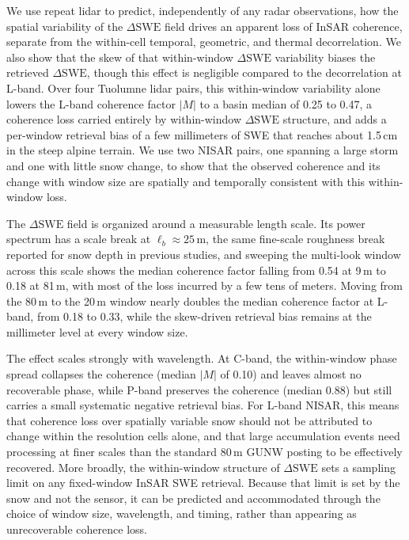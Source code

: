 \documentclass[tc, manuscript]{copernicus}
\begin{document}
\conclusions  %
We use repeat lidar to predict, independently of any radar observations, how the spatial variability of the $\Delta\mathrm{SWE}$ field drives an apparent loss of InSAR coherence, separate from the within-cell temporal, geometric, and thermal decorrelation. We also show that the skew of that within-window $\Delta\mathrm{SWE}$ variability biases the retrieved $\Delta\mathrm{SWE}$, though this effect is negligible compared to the decorrelation at L-band. Over four Tuolumne lidar pairs, this within-window variability alone lowers the L-band coherence factor $|M|$ to a basin median of 0.25 to 0.47, a coherence loss carried entirely by within-window $\Delta\mathrm{SWE}$ structure, and adds a per-window retrieval bias of a few millimeters of SWE that reaches about 1.5\,\unit{cm} in the steep alpine terrain. We use two NISAR pairs, one spanning a large storm and one with little snow change, to show that the observed coherence and its change with window size are spatially and temporally consistent with this within-window loss.

The $\Delta\mathrm{SWE}$ field is organized around a measurable length scale. Its power spectrum has a scale break at $\ell_b \approx 25$\,\unit{m}, the same fine-scale roughness break reported for snow depth in previous studies, and sweeping the multi-look window across this scale shows the median coherence factor falling from 0.54 at 9\,\unit{m} to 0.18 at 81\,\unit{m}, with most of the loss incurred by a few tens of meters. Moving from the 80\,\unit{m} to the 20\,\unit{m} window nearly doubles the median coherence factor at L-band, from 0.18 to 0.33, while the skew-driven retrieval bias remains at the millimeter level at every window size.

The effect scales strongly with wavelength. At C-band, the within-window phase spread collapses the coherence (median $|M|$ of 0.10) and leaves almost no recoverable phase, while P-band preserves the coherence (median 0.88) but still carries a small systematic negative retrieval bias. For L-band NISAR, this means that coherence loss over spatially variable snow should not be attributed to change within the resolution cells alone, and that large accumulation events need processing at finer scales than the standard 80\,\unit{m} GUNW posting to be effectively recovered. More broadly, the within-window structure of $\Delta\mathrm{SWE}$ sets a sampling limit on any fixed-window InSAR SWE retrieval. Because that limit is set by the snow and not the sensor, it can be predicted and accommodated through the choice of window size, wavelength, and timing, rather than appearing as unrecoverable coherence loss.
\end{document}

